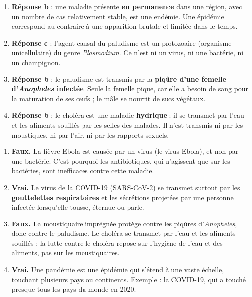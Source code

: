 \documentclass[11pt]{article}
\newcommand{\cle}[1]{{\popxbold\color{popdark}#1}}
\begin{document}
\begin{corrige}
\begin{enumerate}
\item \textbf{Réponse b} : une maladie présente \textbf{en permanence} dans une région, avec un nombre de cas relativement stable, est une \cle{endémie}. Une épidémie correspond au contraire à une apparition brutale et limitée dans le temps.
\item \textbf{Réponse c} : l'agent causal du paludisme est un \cle{protozoaire} (organisme unicellulaire) du genre \emph{Plasmodium}. Ce n'est ni un virus, ni une bactérie, ni un champignon.
\item \textbf{Réponse b} : le paludisme est transmis par la \textbf{piqûre d'une femelle d'\emph{Anopheles} infectée}. Seule la femelle pique, car elle a besoin de sang pour la maturation de ses œufs ; le mâle se nourrit de sucs végétaux.
\item \textbf{Réponse b} : le choléra est une maladie \textbf{hydrique} : il se transmet par l'eau et les aliments souillés par les selles des malades. Il n'est transmis ni par les moustiques, ni par l'air, ni par les rapports sexuels.
\end{enumerate}
\end{corrige}

\begin{corrige}
\begin{enumerate}
\item \textbf{Faux.} La fièvre Ebola est causée par un \cle{virus} (le virus Ebola), et non par une bactérie. C'est pourquoi les antibiotiques, qui n'agissent que sur les bactéries, sont inefficaces contre cette maladie.
\item \textbf{Vrai.} Le virus de la COVID-19 (SARS-CoV-2) se transmet surtout par les \textbf{gouttelettes respiratoires} et les sécrétions projetées par une personne infectée lorsqu'elle tousse, éternue ou parle.
\item \textbf{Faux.} La moustiquaire imprégnée protège contre les piqûres d'\emph{Anopheles}, donc contre le \cle{paludisme}. Le choléra se transmet par l'eau et les aliments souillés : la lutte contre le choléra repose sur l'hygiène de l'eau et des aliments, pas sur les moustiquaires.
\item \textbf{Vrai.} Une \cle{pandémie} est une épidémie qui s'étend à une vaste échelle, touchant plusieurs pays ou continents. Exemple : la COVID-19, qui a touché presque tous les pays du monde en 2020.
\end{enumerate}
\end{corrige}
\end{document}

